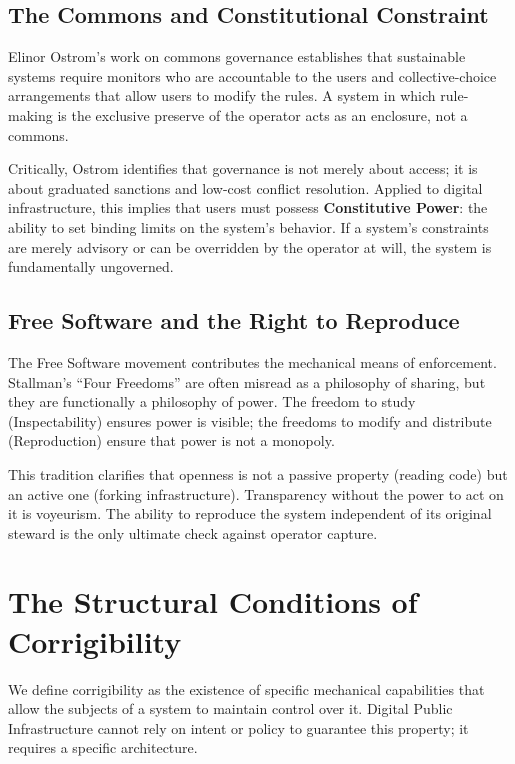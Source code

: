 \documentclass{article}
\begin{document}
\subsection{The Commons and Constitutional Constraint}

Elinor Ostrom's work on commons governance \citep{ostrom1990} establishes that sustainable systems require monitors who are accountable to the users and collective-choice arrangements that allow users to modify the rules. A system in which rule-making is the exclusive preserve of the operator acts as an enclosure, not a commons.

Critically, Ostrom identifies that governance is not merely about access; it is about graduated sanctions and low-cost conflict resolution. Applied to digital infrastructure, this implies that users must possess \textbf{Constitutive Power}: the ability to set binding limits on the system's behavior. If a system's constraints are merely advisory or can be overridden by the operator at will, the system is fundamentally ungoverned.

\subsection{Free Software and the Right to Reproduce}

The Free Software movement \citep{stallman2002} contributes the mechanical means of enforcement. Stallman's ``Four Freedoms'' are often misread as a philosophy of sharing, but they are functionally a philosophy of power. The freedom to study (Inspectability) ensures power is visible; the freedoms to modify and distribute (Reproduction) ensure that power is not a monopoly.

This tradition clarifies that openness is not a passive property (reading code) but an active one (forking infrastructure). Transparency without the power to act on it is voyeurism. The ability to reproduce the system independent of its original steward is the only ultimate check against operator capture.

\section{The Structural Conditions of Corrigibility}
\label{sec:tests}

We define corrigibility as the existence of specific mechanical capabilities that allow the subjects of a system to maintain control over it. Digital Public Infrastructure cannot rely on intent or policy to guarantee this property; it requires a specific architecture.
\end{document}
